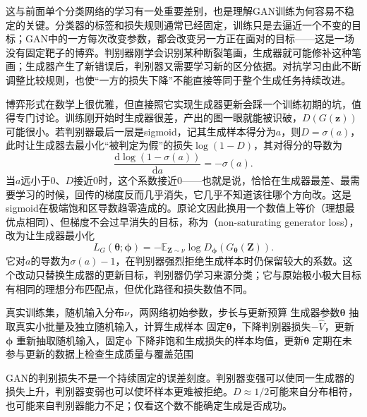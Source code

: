 这与前面单个分类网络的学习有一处重要差别，也是理解GAN训练为何容易不稳定的关键。分类器的标签和损失规则通常已经固定，训练只是去逼近一个不变的目标；GAN中的一方每次改变参数，都会改变另一方正在面对的目标——这是一场没有固定靶子的博弈。判别器刚学会识别某种断裂笔画，生成器就可能修补这种笔画；生成器产生了新错误后，判别器又需要学习新的区分依据。对抗学习由此不断调整比较规则，也使“一方的损失下降”不能直接等同于整个生成任务持续改进。

博弈形式在数学上很优雅，但直接照它实现生成器更新会踩一个训练初期的坑，值得专门讨论。训练刚开始时生成器很差，产出的图一眼就能被识破，$D(G(\bm{z}))$可能很小。若判别器最后一层是sigmoid，记其生成样本得分为$a$，则$D=\sigma(a)$，此时让生成器去最小化“被判定为假”的损失$\log(1-D)$，其对得分的导数为
\[
  \frac{\mathrm{d}\log(1-\sigma(a))}{\mathrm{d}a}
    =-\sigma(a).
\]
当$a$远小于0、$D$接近0时，这个系数接近0——也就是说，恰恰在生成器最差、最需要学习的时候，回传的梯度反而几乎消失，它几乎不知道该往哪个方向改。这是sigmoid在极端饱和区导数趋零造成的。原论文因此换用一个数值上等价（理想最优点相同）、但梯度不会过早消失的目标，称为（non-saturating generator loss），改为让生成器最小化
\begin{equation}
  \label{eq:neural-generative-gan-nonsaturating}
  L_G(\bm{\theta};\bm{\phi})
    =-\mathbb{E}_{\bm{Z}\sim\nu}
       \log D_{\bm{\phi}}(G_{\bm{\theta}}(\bm{Z})).
\end{equation}
它对$a$的导数为$\sigma(a)-1$，在判别器强烈拒绝生成样本时仍保留较大的系数。这个改动只替换生成器的更新目标，判别器仍学习来源分类；它与原始极小极大目标有相同的理想分布匹配点，但优化路径和损失数值不同。

\begin{algorithm}[GAN的小批量交替学习]
  \label{alg:neural-generative-gan}
  \begin{algorithmic}[1]
    \Require 真实训练集，随机输入分布$\nu$，两网络初始参数，步长与更新预算
    \Ensure 生成器参数$\bm{\theta}$
      \State 抽取真实小批量及独立随机输入，计算生成样本
      \State 固定$\bm{\theta}$，下降判别器损失$-\widehat V$，更新$\bm{\phi}$
      \State 重新抽取随机输入，固定$\bm{\phi}$
      \State 下降非饱和生成损失的样本均值，更新$\bm{\theta}$
      \State 定期在未参与更新的数据上检查生成质量与覆盖范围
    \EndFor
  \end{algorithmic}
\end{algorithm}

GAN的判别损失不是一个持续固定的误差刻度。判别器变强可以使同一生成器的损失上升，判别器变弱也可以使坏样本更难被拒绝。$D\approx1/2$可能来自分布相符，也可能来自判别器能力不足；仅看这个数不能确定生成是否成功。

